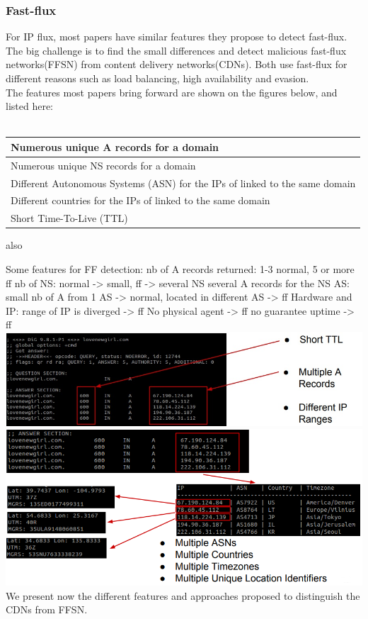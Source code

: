 \subsubsection{Fast-flux}
For IP flux, most papers have similar features they propose to detect fast-flux. The big challenge is to find the small differences and detect malicious fast-flux networks(FFSN) from content delivery networks(CDNs). Both use fast-flux for different reasons such as load balancing, high availability and evasion.\\
The features most papers \cite{honeynet}\cite{ff2}\cite{ff3}bring forward are shown on the figures below\cite{ff_botconf}, and listed here:\\\\
\begin{tabular}{|l|}
\hline
Numerous unique A records for a domain\\
\hline
Numerous unique NS records for a  domain\\
\hline
Different Autonomous Systems (ASN) for the IPs of linked to the same domain\\
\hline
Different countries for the IPs of linked to the same domain\\
\hline
Short Time-To-Live (TTL)\\
\hline
\end{tabular}

also 

Some features for FF detection: 
nb of A records returned: 1-3 normal, 5 or more ff 
nb of NS: normal -> small, ff -> several NS
several A records for the NS AS: small nb of A from 1 AS -> normal,
located in different AS -> ff 
Hardware and IP: range of IP is diverged -> ff 
No physical agent -> ff 
no guarantee uptime -> ff
\cite{ff1}
\includegraphics[scale=.7]{img/ff_features.jpg}\\
\includegraphics[scale=.6]{img/ff_features_2.png}
\\We present now the different features and approaches proposed to distinguish the CDNs from FFSN.\\

